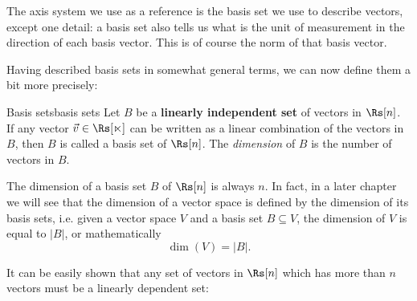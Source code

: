 \begin{center}
\end{center}


The axis system we use as a reference is the basis set we use to describe vectors, except one detail: a basis set also tells us what is the unit of measurement in the direction of each basis vector. This is of course the norm of that basis vector.


Having described basis sets in somewhat general terms, we can now define them a bit more precisely:

\begin{definition}{Basis sets}{basis sets}
	Let $B$ be a \textbf{linearly independent set} of vectors in $\Rs[n]$. If any vector $\vec{v}\in\mathbb{\Rs[n]}$ can be written as a linear combination of the vectors in $B$, then $B$ is called a basis set of $\Rs[n]$. The \emph{dimension} of $B$ is the number of vectors in $B$.
\end{definition}

The dimension of a basis set $B$ of $\Rs[n]$ is always $n$. In fact, in a later chapter we will see that the dimension of a vector space is defined by the dimension of its basis sets, i.e. given a vector space $V$ and a basis set $B\subseteq V$, the dimension of $V$ is equal to $|B|$, or mathematically
\begin{equation}
	\dim(V) = |B|.
	\label{eq:dimension of a vector space}
\end{equation}

It can be easily shown that any set of vectors in $\Rs[n]$ which has more than $n$ vectors must be a linearly dependent set:

